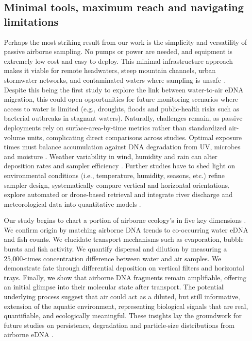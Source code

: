 \documentclass{article}
\begin{document}
\subsection{Minimal tools, maximum reach and navigating limitations}
Perhaps the most striking result from our work is the simplicity and versatility of passive airborne sampling. No pumps or power are needed, and equipment is extremely low cost and easy to deploy. This minimal-infrastructure approach makes it viable for remote headwaters, steep mountain channels, urban stormwater networks, and contaminated waters where sampling is unsafe \cite{harrison2019, bagley2019}. Despite this being the first study to explore the link between water-to-air eDNA migration, this could open opportunities for future monitoring scenarios where access to water is limited (e.g., droughts, floods and public-health risks such as bacterial outbreaks in stagnant waters). Naturally, challenges remain, as passive deployments rely on surface-area-by-time metrics rather than standardized air-volume units, complicating direct comparisons across studies. Optimal exposure times must balance accumulation against DNA degradation from UV, microbes and moisture \cite{brandao-dias2023}. Weather variability in wind, humidity and rain can alter deposition rates and sampler efficiency \cite{johnson2023, johnson2024}. Further studies have to shed light on environmental conditions (i.e., temperature, humidity, seasons, etc.) refine sampler design, systematically compare vertical and horizontal orientations, explore automated or drone-based retrieval and integrate river discharge and meteorological data into quantitative models \cite{galban2021, kirchgeorg2024, shogren2017, wood2021}.

Our study begins to chart a portion of airborne ecology's in five key dimensions \cite{johnson2024}. We confirm origin by matching airborne DNA trends to co-occurring water eDNA and fish counts. We elucidate transport mechanisms such as evaporation, bubble bursts and fish activity. We quantify dispersal and dilution by measuring a 25,000-times concentration difference between water and air samples. We demonstrate fate through differential deposition on vertical filters and horizontal trays. Finally, we show that airborne DNA fragments remain amplifiable, offering an initial glimpse into their molecular state after transport. The potential underlying process suggest that air could act as a diluted, but still informative, extension of the aquatic environment, representing biological signals that are real, quantifiable, and ecologically meaningful. These insights lay the groundwork for future studies on persistence, degradation and particle-size distributions from airborne eDNA \cite{brandao-dias2025a}.
\end{document}
